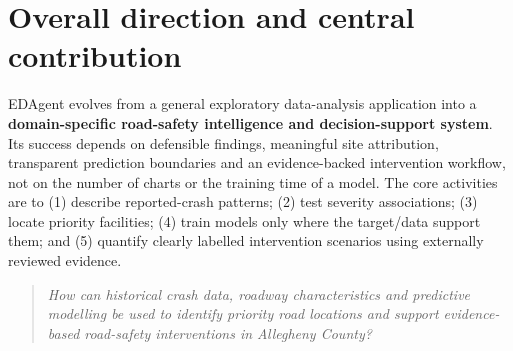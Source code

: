 \documentclass[11pt,a4paper,openany]{report}
\newcommand{\qnote}[1]{\begin{quote}\itshape #1\end{quote}}
\begin{document}
\section{Overall direction and central contribution}
EDAgent evolves from a general exploratory data-analysis application into a \textbf{domain-specific road-safety intelligence and decision-support system}. Its success depends on defensible findings, meaningful site attribution, transparent prediction boundaries and an evidence-backed intervention workflow, not on the number of charts or the training time of a model. The core activities are to (1) describe reported-crash patterns; (2) test severity associations; (3) locate priority facilities; (4) train models only where the target/data support them; and (5) quantify clearly labelled intervention scenarios using externally reviewed evidence.

\qnote{How can historical crash data, roadway characteristics and predictive modelling be used to identify priority road locations and support evidence-based road-safety interventions in Allegheny County?}
\end{document}
